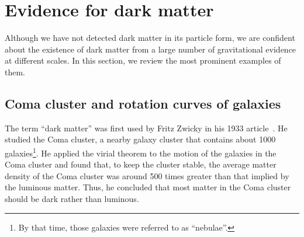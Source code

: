 \documentclass[doublespace,nopageskip]{VTthesis}
\begin{document}
\section{Evidence for dark matter} \label{se:evidence}

Although we have not detected dark matter in its particle form, we are confident about the existence of dark matter from a large number of gravitational evidence at different scales. In this section, we review the most prominent examples of them.

\subsection{Coma cluster and rotation curves of galaxies} \label{sse:rotation_curve}

The term ``dark matter'' was first used by Fritz Zwicky in his 1933 article~\cite{1933AcHPh...6..110Z}. He studied the Coma cluster, a nearby galaxy cluster that contains about 1000 galaxies\footnote{By that time, those galaxies were referred to as ``nebulae''.}. {He applied the virial theorem to the motion of the galaxies in the Coma cluster and found that, to keep the cluster stable, the average matter density of the Coma cluster was around 500 times greater than that implied by the luminous matter. Thus, he concluded that most matter in the Coma cluster should be dark rather than luminous.}
\end{document}
